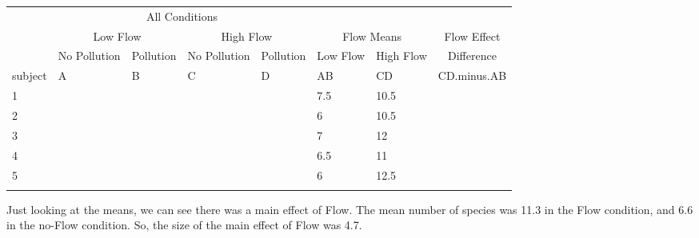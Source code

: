 \documentclass[
  letterpaper,
  DIV=11,
  numbers=noendperiod]{scrreprt}
\begin{document}
\begin{table}
\centering
\begin{tabular}{l|>{}l|>{}l|>{}l|>{}l|l|l|>{}l}
\hline
\multicolumn{1}{c|}{ } & \multicolumn{4}{c|}{ All Conditions} & \multicolumn{3}{c}{ } \\
\cline{2-5}
\multicolumn{1}{c|}{ } & \multicolumn{2}{c|}{Low Flow} & \multicolumn{2}{c|}{High Flow} & \multicolumn{2}{c|}{ Flow Means } & \multicolumn{1}{c}{Flow Effect } \\
\cline{2-3} \cline{4-5} \cline{6-7} \cline{8-8}
\multicolumn{1}{c|}{ } & \multicolumn{1}{c|}{No Pollution} & \multicolumn{1}{c|}{Pollution} & \multicolumn{1}{c|}{No Pollution} & \multicolumn{1}{c|}{Pollution} & \multicolumn{1}{c|}{Low Flow} & \multicolumn{1}{c|}{High Flow} & \multicolumn{1}{c}{Difference} \\
\cline{2-2} \cline{3-3} \cline{4-4} \cline{5-5} \cline{6-6} \cline{7-7} \cline{8-8}
subject & A & B & C & D & AB & CD & CD.minus.AB\\
\hline
1 & \cellcolor{yellow}{10} & \cellcolor{yellow}{5} & \cellcolor{lightgray}{12} & \cellcolor{lightgray}{9} & 7.5 & 10.5 & \cellcolor{lightgray}{3}\\
\hline
2 & \cellcolor{yellow}{8} & \cellcolor{yellow}{4} & \cellcolor{lightgray}{13} & \cellcolor{lightgray}{8} & 6 & 10.5 & \cellcolor{lightgray}{4.5}\\
\hline
3 & \cellcolor{yellow}{11} & \cellcolor{yellow}{3} & \cellcolor{lightgray}{14} & \cellcolor{lightgray}{10} & 7 & 12 & \cellcolor{lightgray}{5}\\
\hline
4 & \cellcolor{yellow}{9} & \cellcolor{yellow}{4} & \cellcolor{lightgray}{11} & \cellcolor{lightgray}{11} & 6.5 & 11 & \cellcolor{lightgray}{4.5}\\
\hline
5 & \cellcolor{yellow}{10} & \cellcolor{yellow}{2} & \cellcolor{lightgray}{13} & \cellcolor{lightgray}{12} & 6 & 12.5 & \cellcolor{lightgray}{6.5}\\
\hline
\cellcolor{lightgray}{Means} & \cellcolor{lightgray}{} & \cellcolor{lightgray}{} & \cellcolor{lightgray}{} & \cellcolor{lightgray}{} & \cellcolor{lightgray}{6.6} & \cellcolor{lightgray}{11.3} & \cellcolor{lightgray}{4.7}\\
\hline
\end{tabular}
\end{table}

Just looking at the means, we can see there was a main effect of Flow.
The mean number of species was 11.3 in the Flow condition, and 6.6 in
the no-Flow condition. So, the size of the main effect of Flow was 4.7.
\end{document}
